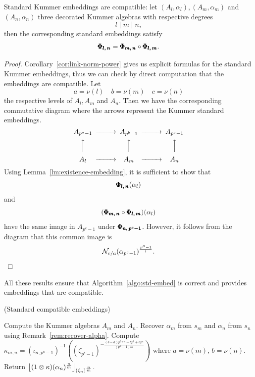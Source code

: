 \begin{prop}
  \label{prop:embeddings-compatibility}
  Standard Kummer embeddings are compatible: let $(A_l, \alpha_l), (A_m,
  \alpha_m)$ and $(A_n, \alpha_n)$ three decorated Kummer algebras with
  respective degrees
  \[
    l\mid m\mid n,
  \]
  then the corresponding standard embeddings satisfy
  \[
    \pmb{\Phi_{{l},\,{n}}} = \pmb{\Phi_{{m},\,{n}}}\circ\pmb{\Phi_{{l},\,{m}}}.
  \]
\end{prop}
\begin{proof}
  Corollary~\ref{cor:link-norm-power} gives us explicit formulas for the
  standard Kummer embeddings, thus we can check by direct computation that the
  embeddings are compatible. Let
  \[
    a = \nu(l)\quad b =\nu(m)\quad c = \nu(n)
  \]
  the respective levels of $A_l, A_m$ and $A_n$. Then we have the corresponding
  commutative diagram where the arrows represent the Kummer standard embeddings.
 \begin{equation*}
\begin{CD}
A_{p^a-1} @>>> A_{p^b-1} @>>> A_{p^c-1} \\
@AAA @AAA @AAA\\
A_l @>>> A_m @>>> A_n
\end{CD}
\end{equation*} 
Using Lemma~\ref{lm:existence-embedding}, it is sufficient to show that
\[
  \pmb{\Phi_{{l},\,{n}}}(\alpha_l)
\]
and
\[
  (\pmb{\Phi_{{m},\,{n}}}\circ\pmb{\Phi_{{l},\,{m}}})(\alpha_l)
\]
have the same image in $A_{p^c-1}$ under $\pmb{\Phi_{{n},\,{p^c-1}}}$. However, it
follows from the diagram that this common image is 
\[
  \mathcal{N}_{c/a}(\alpha_{p^c-1})^{\frac{p^a-1}{l}}.
\]
\end{proof}
All these results ensure that Algorithm~\ref{algo:std-embed} is correct and
provides embeddings that are compatible.
\begin{algorithm}
  \caption{(Standard compatible embeddings)}
  \label{algo:std-embed}
  \begin{algorithmic}[1]
  \State Compute the Kummer algebras $A_m$ and $A_n$.
  \State Recover $\alpha_m$ from $s_m$ and $\alpha_n$ from $s_n$ using
  Remark~\ref{rem:recover-alpha}.%
  \State Compute
  $\kappa_{m,n}=(\iota_{n,p^b-1})^{-1}((\zeta_{p^b-1})^{-\frac{(b-a)p^{b+a}-bp^b+ap^a}{(p^a-1)m}})$
  where $a=\nu(m)$, $b=\nu(n)$.
  \State Return
  $\left\lfloor (1\otimes\kappa)(\alpha_n)^{\frac{n}{m}} \right\rfloor_{(\zeta_n)^{\frac{n}{m}}}$.
  \end{algorithmic}
\end{algorithm}
